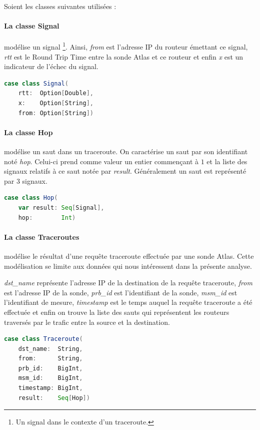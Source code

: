 Soient les classes suivantes utilisées : 

\paragraph{La classe Signal} modélise un signal \footnote{Un signal dans le contexte d'un traceroute.}. Ainsi, \textit{from} est l'adresse IP du routeur émettant ce signal, \textit{rtt} est le Round Trip Time entre la sonde Atlas et ce routeur et enfin \textit{x} est un indicateur de l'échec du signal.
\begin{lstlisting}[language=scala, caption={La classe Signal en Scala }]
case class Signal(
	rtt:  Option[Double],
	x:    Option[String],
	from: Option[String])

\end{lstlisting}

\paragraph{La classe Hop} modélise un saut dans un traceroute. On caractérise un saut par son identifiant noté \textit{hop}. Celui-ci   prend comme valeur un entier commençant à $1$ et la liste des signaux relatifs à ce saut notée par \textit{result}. Généralement un saut est représenté par $3$ signaux.
\begin{lstlisting}[language=scala, caption={La classe Hop en Scala }]
case class Hop(
	var result: Seq[Signal],
	hop:        Int)
\end{lstlisting}
\paragraph{La classe Traceroutes} modélise le résultat d'une requête traceroute effectuée par une sonde Atlas. Cette modélisation se limite aux données qui nous intéressent dans la présente analyse. 

\textit{dst\_name} représente l'adresse IP de la destination de la requête traceroute, \textit{from} est l'adresse IP de la sonde, \textit{prb\_id} est l'identifiant de la sonde, \textit{msm\_id} est l'identifiant de mesure, \textit{timestamp} est le temps auquel la requête traceroute a été effectuée et enfin on trouve la liste des sauts qui représentent les routeurs traversés par le trafic entre la source et la destination. 

\begin{lstlisting}[language=scala, caption={La classe Traceroute en Scala }]
case class Traceroute(
	dst_name:  String,
	from:      String,
	prb_id:    BigInt,
	msm_id:    BigInt,
	timestamp: BigInt,
	result:    Seq[Hop])
\end{lstlisting}
